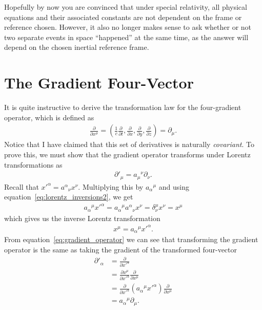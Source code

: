 \documentclass[titlepage,letterpaper,onecolumn,11pt,final]{report}
\numberwithin{equation}{section}
\numberwithin{figure}{section}
\begin{document}
Hopefully by now you are convinced that under special relativity, all physical equations and their associated constants are not dependent on the frame or reference chosen. However, it also no longer makes sense to ask whether or not two separate events in space ``happened'' at the same time, as the answer will depend on the chosen inertial reference frame. 

\section{The Gradient Four-Vector} \label{sec:Gradient}

It is quite instructive to derive the transformation law for the four-gradient operator, which is defined as
\begin{gather}
	\label{eq:gradient_operator}
	\frac{\partial}{\partial x^{\mu}} =  \left( \frac{1}{c} \frac{\partial}{\partial t}, \frac{\partial}{\partial x}, \frac{\partial}{\partial y}, \frac{\partial}{\partial z} \right) = \partial_{\mu}.
\end{gather}
%
Notice that I have claimed that this set of derivatives is naturally \emph{covariant}. To prove this, we must show that the gradient operator transforms under Lorentz transformations as
\begin{gather}
	{\partial'}_{\mu} = {a_{\mu}}^{\nu} \partial_{\nu}.
\end{gather}
%
Recall that ${x'}^{\alpha} = {a^{\alpha}}_{\nu} x^{\nu}$. Multiplying this by ${a_{\alpha}}^{\mu}$ and using equation~\ref{eq:lorentz_inversions2}, we get
\begin{gather}
	{a_{\alpha}}^{\mu} {x'}^{\alpha} = {a_{\alpha}}^{\mu} {a^{\alpha}}_{\nu} x^{\nu} = \delta^{\mu}_{\nu} x^{\nu} = x^{\mu}
\end{gather}
%
which gives us the inverse Lorentz transformation
\begin{gather}
	\label{eq:inverse_lorentz}
	x^{\mu} = {a_{\alpha}}^{\mu} {x'}^{\alpha}.
\end{gather}
%
From equation~\ref{eq:gradient_operator} we can see that transforming the gradient operator is the same as taking the gradient of the transformed four-vector
\begin{equation}
\begin{split}
	{\partial '}_{\alpha} &= \frac{\partial}{\partial {x'}^{{\alpha}}} \\
  &= \frac{\partial x^{\mu}}{\partial {x'}^{\alpha}} \frac{\partial}{\partial x^{\mu}} \\
	&= \frac{\partial}{\partial {x'}^{\alpha}} \left( {a_{\alpha}}^{\mu} {x'}^{\alpha} \right) \frac{\partial}{\partial x^{\mu}} \\
	&= {a_{\alpha}}^{\mu} \partial_{\mu}.
\end{split}
\end{equation}
\end{document}
